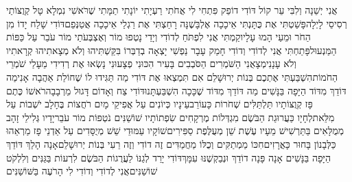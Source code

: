 \documentclass[../main/main.tex]{subfiles}
\begin{document}
\begin{multicols*}{\ncols}
אֲנִי יְשֵׁנָה וְלִבִּי עֵר קוֹל דּוֹדִי דוֹפֵק פִּתְחִי לִי אֲחֹתִי רַעְיָתִי יוֹנָתִי תַמָּתִי שֶׁרֹּאשִׁי נִמְלָא טָל קְוֻצּוֹתַי רְסִיסֵי לָיְלָה\PreVerseSpace{}פָּשַׁטְתִּי אֶת כֻּתָּנְתִּי אֵיכָכָה אֶלְבָּשֶׁנָּה רָחַצְתִּי אֶת רַגְלַי אֵיכָכָה אֲטַנְּפֵם\PreVerseSpace{}דּוֹדִי שָׁלַח יָדוֹ מִן הַחֹר וּמֵעַי הָמוּ עָלָיו\PreVerseSpace{}קַמְתִּי אֲנִי לִפְתֹּחַ לְדוֹדִי וְיָדַי נָטְפוּ מוֹר וְאֶצְבְּעֹתַי מוֹר עֹבֵר עַל כַּפּוֹת הַמַּנְעוּל\PreVerseSpace{}פָּתַחְתִּי אֲנִי לְדוֹדִי וְדוֹדִי חָמַק עָבָר נַפְשִׁי יָצְאָה בְדַבְּרוֹ בִּקַּשְׁתִּיהוּ וְלֹא מְצָאתִיהוּ קְרָאתִיו וְלֹא עָנָנִי\PreVerseSpace{}מְצָאֻנִי הַשֹּׁמְרִים הַסֹּבְבִים בָּעִיר הִכּוּנִי פְצָעוּנִי נָשְׂאוּ אֶת רְדִידִי מֵעָלַי שֹׁמְרֵי הַחֹמוֹת\PreVerseSpace{}הִשְׁבַּעְתִּי אֶתְכֶם בְּנוֹת יְרוּשָׁלֵם אִם תִּמְצְאוּ אֶת דּוֹדִי מַה תַּגִּידוּ לוֹ שֶׁחוֹלַת אַהֲבָה אָנִי\PreVerseSpace{}מַה דּוֹדֵךְ מִדּוֹד הַיָּפָה בַּנָּשִׁים מַה דּוֹדֵךְ מִדּוֹד שֶׁכָּכָה הִשְׁבַּעְתָּנוּ\PreVerseSpace{}דּוֹדִי צַח וְאָדוֹם דָּגוּל מֵרְבָבָה\PreVerseSpace{}רֹאשׁוֹ כֶּתֶם פָּז קְוֻצּוֹתָיו תַּלְתַּלִּים שְׁחֹרוֹת כָּעוֹרֵב\PreVerseSpace{}עֵינָיו כְּיוֹנִים עַל אֲפִיקֵי מָיִם רֹחֲצוֹת בֶּחָלָב יֹשְׁבוֹת עַל מִלֵּאת\PreVerseSpace{}לְחָיָו כַּעֲרוּגַת הַבֹּשֶׂם מִגְדְּלוֹת מֶרְקָחִים שִׂפְתוֹתָיו שׁוֹשַׁנִּים נֹטְפוֹת מוֹר עֹבֵר\PreVerseSpace{}יָדָיו גְּלִילֵי זָהָב מְמֻלָּאִים בַּתַּרְשִׁישׁ מֵעָיו עֶשֶׁת שֵׁן מְעֻלֶּפֶת סַפִּירִים\PreVerseSpace{}שׁוֹקָיו עַמּוּדֵי שֵׁשׁ מְיֻסָּדִים עַל אַדְנֵי פָז מַרְאֵהוּ כַּלְּבָנוֹן בָּחוּר כָּאֲרָזִים\PreVerseSpace{}חִכּוֹ מַמְתַקִּים וְכֻלּוֹ מַחֲמַדִּים זֶה דוֹדִי וְזֶה רֵעִי בְּנוֹת יְרוּשָׁלֵם\PreChapterSpace{}אָנָה הָלַךְ דּוֹדֵךְ הַיָּפָה בַּנָּשִׁים אָנָה פָּנָה דוֹדֵךְ וּנְבַקְשֶׁנּוּ עִמָּךְ\PreVerseSpace{}דּוֹדִי יָרַד לְגַנּוֹ לַעֲרֻגוֹת הַבֹּשֶׂם לִרְעוֹת בַּגַּנִּים וְלִלְקֹט שׁוֹשַׁנִּים\PreVerseSpace{}אֲנִי לְדוֹדִי וְדוֹדִי לִי הָרֹעֶה בַּשּׁוֹשַׁנִּים\OpenSection{}\par

\end{multicols*}
\end{document}
